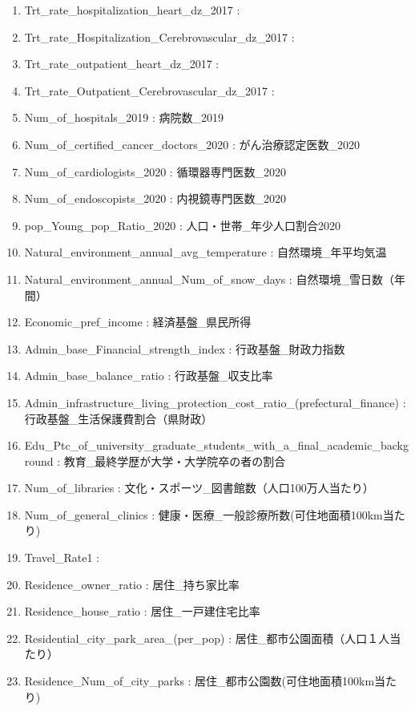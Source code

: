 \begin{enumerate}
  \item   Trt\_rate\_hospitalization\_heart\_dz\_2017  :
  \item   Trt\_rate\_Hospitalization\_Cerebrovascular\_dz\_2017  :
  \item   Trt\_rate\_outpatient\_heart\_dz\_2017  :
  \item   Trt\_rate\_Outpatient\_Cerebrovascular\_dz\_2017  :
  \item   Num\_of\_hospitals\_2019  :   病院数\_2019
  \item   Num\_of\_certified\_cancer\_doctors\_2020  :   がん治療認定医数\_2020
  \item   Num\_of\_cardiologists\_2020  :   循環器専門医数\_2020
  \item   Num\_of\_endoscopists\_2020  :   内視鏡専門医数\_2020
  \item   pop\_Young\_pop\_Ratio\_2020  :   人口・世帯\_年少人口割合2020
  \item   Natural\_environment\_annual\_avg\_temperature  :   自然環境\_年平均気温
  \item   Natural\_environment\_annual\_Num\_of\_snow\_days  :   自然環境\_雪日数（年間）
  \item   Economic\_pref\_income  :   経済基盤\_県民所得
  \item   Admin\_base\_Financial\_strength\_index  :   行政基盤\_財政力指数
  \item   Admin\_base\_balance\_ratio  :   行政基盤\_収支比率
  \item   Admin\_infrastructure\_living\_protection\_cost\_ratio\_(prefectural\_finance)  :   行政基盤\_生活保護費割合（県財政）
  \item   Edu\_Ptc\_of\_university\_graduate\_students\_with\_a\_final\_academic\_background  :   教育\_最終学歴が大学・大学院卒の者の割合
  \item   Num\_of\_libraries  :   文化・スポーツ\_図書館数（人口100万人当たり）
  \item   Num\_of\_general\_clinics  :   健康・医療\_一般診療所数(可住地面積100km当たり)
  \item   Travel\_Rate1  :
  \item   Residence\_owner\_ratio  :   居住\_持ち家比率
  \item   Residence\_house\_ratio  :   居住\_一戸建住宅比率
  \item   Residential\_city\_park\_area\_(per\_pop)  :   居住\_都市公園面積（人口１人当たり）
  \item   Residence\_Num\_of\_city\_parks  :   居住\_都市公園数(可住地面積100km当たり)

\end{enumerate}
